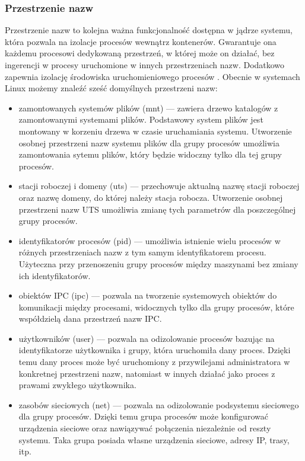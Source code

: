 \documentclass[12pt]{report}
\let\Oldsubsubsection\subsubsection
\renewcommand{\subsubsection}{\FloatBarrier\Oldsubsubsection}
\begin{document}
\subsubsection{Przestrzenie nazw}
Przestrzenie nazw to kolejna ważna funkcjonalność dostępna w jądrze systemu, która pozwala na izolacje procesów wewnątrz kontenerów. Gwarantuje ona każdemu procesowi dedykowaną przestrzeń, w której może on działać, bez ingerencji w procesy uruchomione w innych przestrzeniach nazw. Dodatkowo zapewnia izolację środowiska uruchomieniowego procesów \cite{linux}. Obecnie w systemach Linux możemy znaleźć sześć domyślnych przestrzeni nazw:
\begin{itemize}
\item zamontowanych systemów plików (mnt) --- zawiera drzewo katalogów z zamontowanymi systemami plików. Podstawowy system plików jest montowany w korzeniu drzewa w czasie uruchamiania systemu. Utworzenie osobnej przestrzeni nazw systemu plików dla grupy procesów umożliwia zamontowania sytemu plików, który będzie widoczny tylko dla tej grupy procesów. 

\item stacji roboczej i domeny (uts) --- przechowuje aktualną nazwę stacji roboczej oraz nazwę domeny, do której należy stacja robocza. Utworzenie osobnej przestrzeni nazw UTS umożliwia zmianę tych parametrów dla poszczególnej grupy procesów.

\item identyfikatorów procesów (pid) --- umożliwia istnienie wielu procesów w różnych przestrzeniach nazw z tym samym identyfikatorem procesu. Użyteczna przy przenoszeniu grupy procesów między maszynami bez zmiany ich identyfikatorów.

\item obiektów IPC (ipc) --- pozwala na tworzenie systemowych obiektów do komunikacji między procesami, widocznych tylko dla grupy procesów, które współdzielą dana przestrzeń nazw IPC.

\item użytkowników (user) --- pozwala na odizolowanie procesów bazując na identyfikatorze użytkownika i grupy, która uruchomiła dany proces. Dzięki temu dany proces może być uruchomiony z przywilejami administratora w konkretnej przestrzeni nazw, natomiast w innych działać jako proces z prawami zwykłego użytkownika.

\item zasobów sieciowych (net) --- pozwala na odizolowanie podsystemu sieciowego dla grupy procesów. Dzięki temu grupa procesów może konfigurować urządzenia sieciowe oraz nawiązywać połączenia niezależnie od reszty systemu. Taka grupa posiada własne urządzenia sieciowe, adresy IP, trasy, itp.
\end{itemize}
\end{document}
